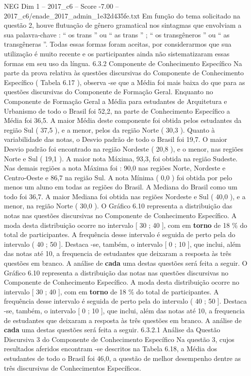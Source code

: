 \begin{textsample}{NEG Dim 1 – 2017\_c6 – Score -7.00 – 2017\_c6/enade\_2017\_admin\_1e32d435fe.txt}
Em função do tema solicitado na questão 2, houve flutuação de gênero gramatical nos sintagmas que envolviam a sua palavra-chave : “ os trans ” ou “ as trans ” ; “ os transgêneros ” ou “ as transgêneras ”.
Todas essas formas foram aceitas, por considerarmos que sua utilização é muito recente e os participantes ainda não sistematizaram essas formas em seu uso da língua. 6.3.2 Componente de Conhecimento Específico Na parte da prova relativa às questões discursivas do Componente de Conhecimento Específico ( Tabela 6.17 ), observa -se que a Média foi mais baixa do que para as questões discursivas do Componente de Formação Geral.
Enquanto no Componente de Formação Geral a Média para estudantes de Arquitetura e Urbanismo de todo o Brasil foi 52,2, na parte de Conhecimento Específico a Média foi 36,5.
A maior Média deste componente foi obtida pelos estudantes da região Sul ( 37,5 ), e a menor, pelos da região Norte ( 30,3 ).
Quanto à variabilidade das notas, o Desvio padrão de todo o Brasil foi 19,7.
O maior Desvio padrão foi encontrado na região Nordeste ( 20,8 ), e o menor, nas regiões Norte e Sul ( 19,1 ).
A maior nota Máxima, 93,3, foi obtida na região Sudeste.
Nas demais regiões a nota Máxima foi : 90,0 nas regiões Norte, Nordeste e Centro-Oeste e 86,7 na região Sul.
A nota Mínima ( 0,0 ) foi obtida por pelo menos um aluno em todas as regiões do Brasil.
A Mediana do Brasil como um todo foi 36,7.
A maior Mediana foi obtida nas regiões Nordeste e Sul ( 40,0 ), e a menor, na região Norte ( 30,0 ).
O Gráfico 6.10 representa a distribuição das notas nas questões discursivas no Componente de Conhecimento Específico.
A moda desta distribuição ocorre no intervalo [ 30 ; 40 ], com em \textbf{torno} de 18 \% do total de participantes.
A frequência desse intervalo é seguida de perto pela do intervalo ( 40 ; 50 ].
Destaca -se, também, o intervalo [ 0 ; 10 ], que inclui, além das notas até 10, a frequencia de estudantes que deixaram a resposta às três questões em branco.
A análise de \textbf{cada} uma destas questões será feita a seguir.
O Gráfico 6.10 representa a distribuição das notas nas questões discursivas no Componente de Conhecimento Específico.
A moda desta distribuição ocorre no intervalo [ 30 ; 40 ], com em \textbf{torno} de 18 \% do total de participantes.
A frequência desse intervalo é seguida de perto pela do intervalo ( 40 ; 50 ].
Destaca -se, também, o intervalo [ 0 ; 10 ], que inclui, além das notas até 10, a frequencia de estudantes que deixaram a resposta às três questões em branco.
A análise de \textbf{cada} uma destas questões será feita a seguir. 6.3.2.1 Análise da Questão Discursiva 3 do Componente de Conhecimento Específico Na questão 3, cujos resultados aferidos encontram -se descritos na Tabela 6.18, a Média dos estudantes de todo o Brasil foi 46,0, a questão de melhor desempenho dentre as três discursivas de Conhecimentos Específicos.

\end{textsample}
